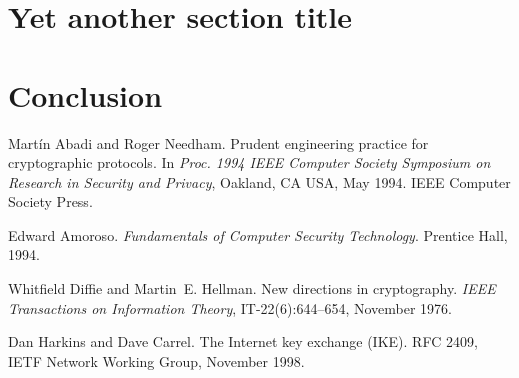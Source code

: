 \documentclass[a4paper,12pt]{article}
\begin{document}


\pagebreak[3]
\section{Yet another section title}




\pagebreak[3]
\section{Conclusion}



\clearpage

\begin{thebibliography}{1}
\label{Bibliography}

Mart\'in Abadi and Roger Needham.
\newblock Prudent engineering practice for cryptographic protocols.
\newblock In \textit{Proc. 1994 IEEE Computer Society Symposium on Research 
  in Security and Privacy}, Oakland, CA USA, May 1994. IEEE Computer Society
  Press.

Edward Amoroso.
\newblock \textit{Fundamentals of Computer Security Technology}.
\newblock Prentice Hall, 1994.

Whitfield Diffie and Martin~E. Hellman.
\newblock New directions in cryptography.
\newblock \textit{IEEE Transactions on Information Theory}, IT-22(6):644--654,
  November 1976.

Dan Harkins and Dave Carrel.
\newblock The Internet key exchange (IKE).
\newblock RFC 2409, IETF Network Working Group, November 1998.

\end{thebibliography}


%
% 
%
%
\end{document}
